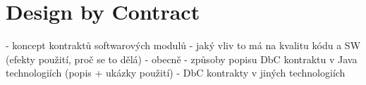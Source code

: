 \chapter{Design by Contract}
 - koncept kontraktů softwarových modulů
 - jaký vliv to má na kvalitu kódu a SW (efekty použití, proč se to dělá)
 - obecně
 - způsoby popisu DbC kontraktu v Java technologiích (popis + ukázky použití)
 - DbC kontrakty v jiných technologiích